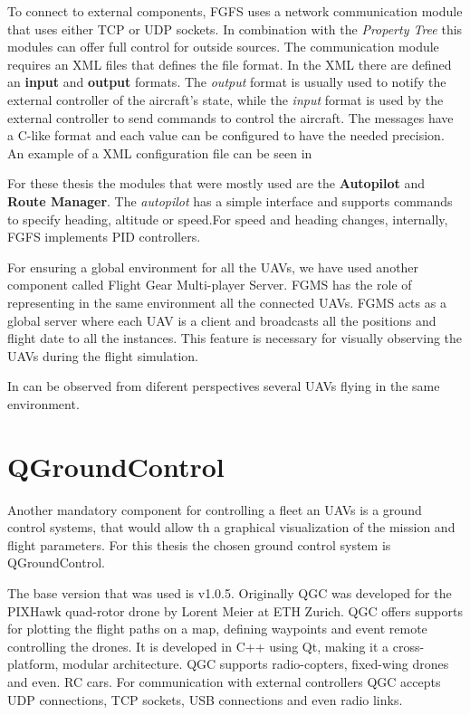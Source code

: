 To connect to external components, FGFS uses a network communication module
that uses either TCP or UDP sockets. In combination with the \textit{Property Tree}
this modules can offer full control for outside sources. The communication module
requires an XML files that defines the file format. In the XML there are defined
an \textbf{input} and \textbf{output} formats. The \textit{output} format is 
usually used to notify the external controller of the aircraft's state, while
the \textit{input} format is used by the external controller to send commands
to control the aircraft. The messages have a C-like format and each value can
be configured to have the needed precision. An example of a XML configuration file
can be seen in 

For these thesis the modules that were mostly used are the \textbf{Autopilot} and
\textbf{Route Manager}. The \textit{autopilot} has a simple interface and supports
commands to specify heading, altitude or speed.For speed and heading changes,
internally, FGFS implements PID controllers.

For ensuring a global environment for all the UAVs, we have used another component
called Flight Gear Multi-player Server. FGMS has the role of representing in the
same environment all the connected UAVs. FGMS acts as a global server where each
UAV is a client and broadcasts all the positions and flight date to all the instances.
This feature is necessary for visually observing the UAVs during the flight 
simulation.

In  can be observed from diferent perspectives 
several UAVs flying in the same environment.


\section{QGroundControl}
\label{sec:qgc}

Another mandatory component for controlling a fleet an UAVs is a ground control
systems, that would allow th a graphical visualization of the mission and 
flight parameters. For this thesis the chosen ground control system is QGroundControl.

The base version that was used is v1.0.5. Originally QGC was developed
for the PIXHawk quad-rotor drone by Lorent Meier at ETH Zurich. QGC offers supports
for plotting the flight paths on a map, defining waypoints and event remote 
controlling the drones. It is developed in C++ using Qt, making it a cross-platform, 
modular architecture. QGC supports radio-copters, fixed-wing drones and even.
RC cars. For communication with external controllers QGC accepts UDP connections, 
TCP sockets, USB connections and even radio links.

